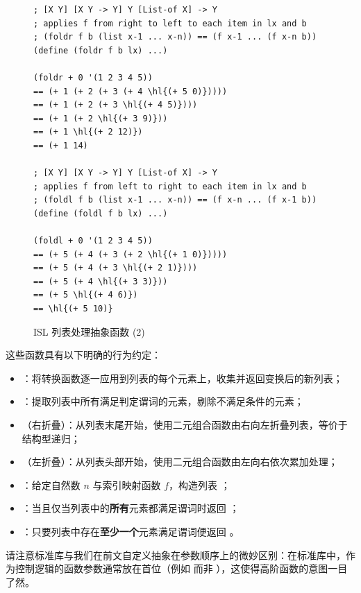 \begin{figure}[htbp]
  \centering
\begin{stepperbox}[unbreakable]
\begin{Verbatim}[commandchars=\\\{\}, fontsize=\scriptsize]
; [X Y] [X Y -> Y] Y [List-of X] -> Y
; applies f from right to left to each item in lx and b
; (foldr f b (list x-1 ... x-n)) == (f x-1 ... (f x-n b))
(define (foldr f b lx) ...)

(foldr + 0 '(1 2 3 4 5))
== (+ 1 (+ 2 (+ 3 (+ 4 \hl{(+ 5 0)}))))
== (+ 1 (+ 2 (+ 3 \hl{(+ 4 5)})))
== (+ 1 (+ 2 \hl{(+ 3 9)}))
== (+ 1 \hl{(+ 2 12)})
== (+ 1 14)

; [X Y] [X Y -> Y] Y [List-of X] -> Y
; applies f from left to right to each item in lx and b
; (foldl f b (list x-1 ... x-n)) == (f x-n ... (f x-1 b))
(define (foldl f b lx) ...)

(foldl + 0 '(1 2 3 4 5))
== (+ 5 (+ 4 (+ 3 (+ 2 \hl{(+ 1 0)}))))
== (+ 5 (+ 4 (+ 3 \hl{(+ 2 1)})))
== (+ 5 (+ 4 \hl{(+ 3 3)}))
== (+ 5 \hl{(+ 4 6)})
== \hl{(+ 5 10)}
\end{Verbatim}
\end{stepperbox}
  \caption{ISL 列表处理抽象函数 (2)}
  \label{fig:96}
\end{figure}

这些函数具有以下明确的行为约定：
\begin{itemize}
  \item {}：将转换函数逐一应用到列表的每个元素上，收集并返回变换后的新列表；
  \item {}：提取列表中所有满足判定谓词的元素，剔除不满足条件的元素；
  \item {}（右折叠）：从列表末尾开始，使用二元组合函数由右向左折叠列表，等价于结构型递归；
  \item {}（左折叠）：从列表头部开始，使用二元组合函数由左向右依次累加处理；
  \item {}：给定自然数 $n$ 与索引映射函数 $f$，构造列表 ；
  \item {}：当且仅当列表中的\textbf{所有}元素都满足谓词时返回 ；
  \item {}：只要列表中存在\textbf{至少一个}元素满足谓词便返回 。
\end{itemize}

请注意标准库与我们在前文自定义抽象在参数顺序上的微妙区别：在标准库中，作为控制逻辑的函数参数通常放在首位（例如  而非 ），这使得高阶函数的意图一目了然。

